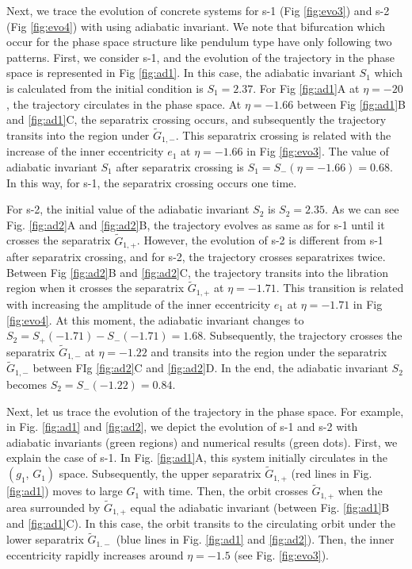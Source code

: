 \documentclass[useAMS,usenatbib,twocolumn]{mn2e}
\begin{document}
Next, we trace the evolution of concrete systems for s-1 (Fig \ref{fig:evo3}) and s-2 (Fig \ref{fig:evo4}) with using adiabatic invariant.
We note that bifurcation which occur for the phase space structure like pendulum type have only following two patterns.
First, we consider s-1, and the evolution of the trajectory in the phase space is represented in Fig \ref{fig:ad1}. 
In this case, the adiabatic invariant $S_1$ which is calculated from the initial condition is $S_{1}=2.37$. 
For Fig \ref{fig:ad1}A at $\eta=-20$, the trajectory circulates in the phase space. 
At $\eta=-1.66$ between Fig \ref{fig:ad1}B and \ref{fig:ad1}C, the separatrix crossing occurs, 
and subsequently the trajectory transits into the region under $\tilde{G}_{1,-}$. 
This separatrix crossing is related with the increase of the inner eccentricity $e_1$ at $\eta=-1.66 $ in Fig \ref{fig:evo3}.
The value of adiabatic invariant $S_1$ after separatrix crossing is $S_1=S_{-}(\eta=-1.66)= 0.68$. 
In this way, for s-1, the separatrix crossing occurs one time.

For s-2, the initial value of the adiabatic invariant $S_2$ is $S_2=2.35$. 
As we can see Fig.
\ref{fig:ad2}A and \ref{fig:ad2}B, the trajectory evolves as same as for s-1 until it crosses the separatrix $\tilde{G}_{1,+}$.
However, the evolution of s-2 is different from s-1 after separatrix crossing, and for s-2, the trajectory crosses separatrixes twice. 
Between Fig \ref{fig:ad2}B and \ref{fig:ad2}C, the trajectory transits into the libration region when it crosses the separatrix $\tilde{G}_{1,+}$ at $\eta=-1.71$.
This transition is related with increasing the amplitude of the inner eccentricity $e_1$ at $\eta=-1.71$ in Fig \ref{fig:evo4}.
At this moment, the adiabatic invariant changes to $S_2=S_{+}(-1.71) - S_{-}(-1.71)=1.68$.
Subsequently, the trajectory crosses the separatrix $\tilde{G}_{1,-}$ at $\eta=-1.22$ and transits into the region under the separatrix $\tilde{G}_{1,-}$ between FIg \ref{fig:ad2}C and \ref{fig:ad2}D.
In the end, the adiabatic invariant $S_2$ becomes $S_2=S_{-}(-1.22)=0.84$.


Next, let us trace the evolution of the trajectory in the phase
space.
For example, in Fig. \ref{fig:ad1} and \ref{fig:ad2}, we depict
the evolution of s-1 and s-2 with adiabatic invariants (green
regions) and numerical results (green dots).
First, we explain the case of s-1. In Fig. \ref{fig:ad1}A, this
system initially circulates in the $(g_1,\,G_1)$ space.
Subsequently, the upper separatrix $\tilde{G}_{1,+}$ (red lines
in Fig. \ref{fig:ad1}) moves to large $G_1$ with time. Then, the
orbit crosses $\tilde{G}_{1,+}$ when the area surrounded by
$\tilde{G}_{1,+}$ equal the adiabatic invariant (between Fig.
\ref{fig:ad1}B and \ref{fig:ad1}C). In this case, the orbit
transits to the circulating orbit under the lower separatrix $\tilde{G}_{1.-}$
(blue lines in Fig. \ref{fig:ad1} and \ref{fig:ad2}). Then, the
inner eccentricity rapidly increases around $\eta=-1.5$ (see Fig. \ref{fig:evo3}).
\end{document}
